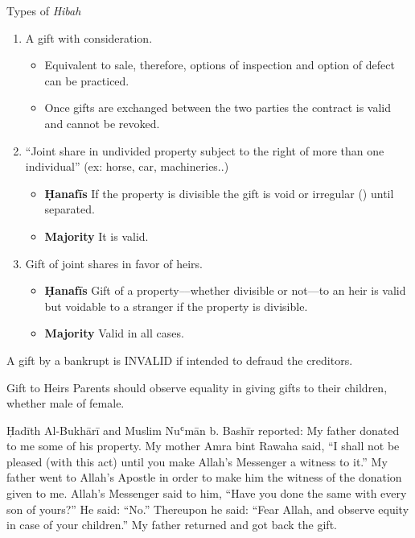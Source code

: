 \begin{frame}{Types of \textit{Hibah} \hfill {}}
\begin{enumerate}
\item {} A gift with consideration.
\begin{itemize}
\item Equivalent to sale, therefore, options of inspection and option of defect can be practiced.  
\item Once gifts are exchanged between the two parties the contract is valid and cannot be revoked.
\end{itemize}
\item {} “Joint share in undivided property subject to the right of more than one individual” (ex: horse, car, machineries..)
\begin{itemize}
\item \textbf{Ḥanafīs} If the property is divisible the gift is void or irregular ({}) until separated.
\item \textbf{Majority} It is valid.
\end{itemize}
\end{enumerate}
\end{frame}

\begin{frame}
\begin{enumerate}
  \setcounter{enumi}{2}
\item Gift of joint shares in favor of heirs.
\begin{itemize}
\item \textbf{Ḥanafīs} Gift of a property--–whether divisible or not---to an heir is valid but voidable to a stranger if the property is divisible.
\item \textbf{Majority} Valid in all cases.
\end{itemize}
\end{enumerate}
\end{frame}

\begin{frame}[standout]
A gift by a bankrupt is \alert{INVALID} if intended to defraud the creditors.
\end{frame}

\begin{frame}{Gift to Heirs}
Parents should observe equality in giving gifts to their children, whether male of female.
\begin{block}{Ḥadīth \hfill Al-Bukhārī and Muslim}
Nuʿmān b. Bashīr reported: My father donated to me some of his property. My mother Amra bint Rawaha said, “I shall not be pleased (with this act) until you make Allah's Messenger \pbuh a witness to it.” My father went to Allah's Apostle \pbuh in order to make him the witness of the donation given to me. Allah's Messenger \pbuh said to him, “Have you done the same with every son of yours?” He said: “No.” Thereupon he \pbuh said: “Fear Allah, and observe equity in case of your children.” My father returned and got back the gift.
\end{block}
\end{frame}


